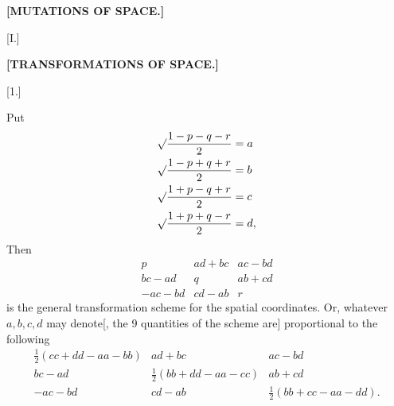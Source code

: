 \begin{center}\bfseries [MUTATIONS OF SPACE.]\end{center}
\begin{center}[I.]\end{center}
\begin{center}\bfseries [TRANSFORMATIONS OF SPACE.]\end{center}
\begin{center}[1.]\end{center}

Put
\[
\begin{aligned}
\mathord{\surd}\frac{1-p-q-r}{2}&=a\\
\mathord{\surd}\frac{1-p+q+r}{2}&=b\\
\mathord{\surd}\frac{1+p-q+r}{2}&=c\\
\mathord{\surd}\frac{1+p+q-r}{2}&=d,
\end{aligned}
\]
Then
\[
\begin{array}{ccc}
p&ad+bc&ac-bd\\
bc-ad&q&ab+cd\\
-ac-bd&cd-ab&r
\end{array}
\]
is the general transformation scheme for the spatial coordinates. Or, whatever $a,b,c,d$ may denote[, the 9 quantities of the scheme are] proportional to the following
\[
\begin{array}{ccc}
\tfrac12(cc+dd-aa-bb)&ad+bc&ac-bd\\
bc-ad&\tfrac12(bb+dd-aa-cc)&ab+cd\\
-ac-bd&cd-ab&\tfrac12(bb+cc-aa-dd).
\end{array}
\]
